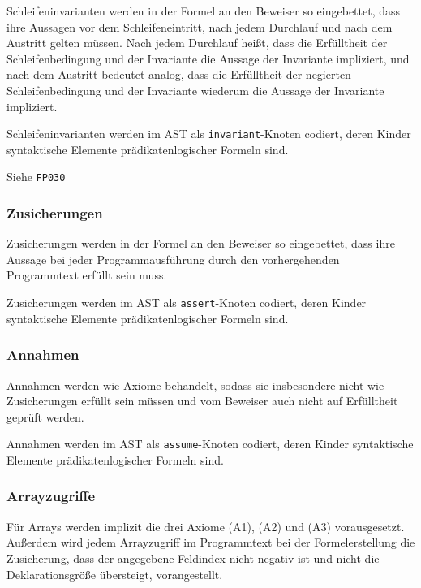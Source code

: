 Schleifeninvarianten werden in der Formel an den Beweiser so
eingebettet, dass ihre Aussagen vor dem Schleifeneintritt, nach jedem
Durchlauf und nach dem Austritt gelten müssen. Nach jedem Durchlauf
heißt, dass die Erfülltheit der Schleifenbedingung und der Invariante
die Aussage der Invariante impliziert, und nach dem Austritt bedeutet
analog, dass die Erfülltheit der negierten Schleifenbedingung und der
Invariante wiederum die Aussage der Invariante impliziert.%

Schleifeninvarianten werden im AST als \texttt{invariant}-Knoten
codiert, deren Kinder syntaktische Elemente prädikatenlogischer
Formeln sind.%

Siehe \texttt{FP030}%

\subsubsection{Zusicherungen}%

Zusicherungen werden in der Formel an den Beweiser so eingebettet,
dass ihre Aussage bei jeder Programmausführung durch den
vorhergehenden Programmtext erfüllt sein muss.%

Zusicherungen werden im AST als \texttt{assert}-Knoten codiert, deren
Kinder syntaktische Elemente prädikatenlogischer Formeln sind.%

\subsubsection{Annahmen}%

Annahmen werden wie Axiome behandelt, sodass sie insbesondere nicht
wie Zusicherungen erfüllt sein müssen und vom Beweiser auch nicht auf Erfülltheit
geprüft werden.%

Annahmen werden im AST als \texttt{assume}-Knoten codiert,
deren Kinder syntaktische Elemente prädikatenlogischer Formeln sind.%

\subsubsection{Arrayzugriffe}%

Für Arrays werden implizit die drei Axiome (A1), (A2) und (A3)
vorausgesetzt. Außerdem wird jedem Arrayzugriff im Programmtext bei
der Formelerstellung die Zusicherung, dass der angegebene Feldindex
nicht negativ ist und nicht die Deklarationsgröße übersteigt, vorangestellt.%

